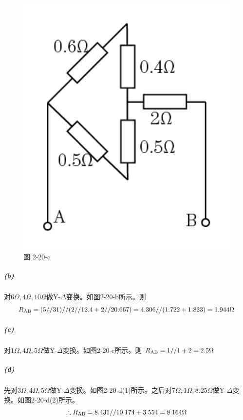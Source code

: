 \documentclass[hyperref, UTF8]{ctexart}
\begin{document}
\begin{figure}[!htb]
\begin{minipage}[t]{0.187\textwidth}
    \centering
    \includegraphics[width=1\textwidth]{p2-20-c-sol.png}
    \caption*{图 2-20-c}
  \end{minipage}
\end{figure}

\subparagraph{(b)}对$6\Omega, 4\Omega, 10\Omega$做Y-$\Delta$变换。如图2-20-b所示。则
$$R_ {\rm AB}
=(5//31)//(2//12.4+2//20.667)
=4.306//(1.722+1.823)=1.944\Omega$$

\subparagraph{(c)}对$1\Omega, 4\Omega, 5\Omega$做Y-$\Delta$变换。如图2-20-c所示。则
$R_ {\rm AB}=1//1+2=2.5\Omega$

\subparagraph{(d)}先对$3\Omega, 4\Omega, 5\Omega$做Y-$\Delta$变换。如图2-20-d(1)所示。之后对$7\Omega, 1\Omega, 8.25\Omega$做Y-$\Delta$变换。如图2-20-d(2)所示。
$$\therefore R_{\rm AB}=8.431//10.174+3.554=8.164\Omega$$
\end{document}
